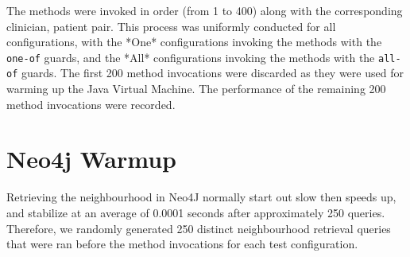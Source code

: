 \documentclass{acm_proc_article-sp}
\newcommand{\textcode}[1]{\texttt{#1}}
\begin{document}
The methods were invoked in order (from 1 to 400) along with the
corresponding clinician, patient pair. This process was uniformly
conducted for all configurations, with the *\textsf{One}*
configurations invoking the methods with the \textcode{one-of} guards,
and the *\textsf{All}* configurations invoking the methods with the
\textcode{all-of} guards. The first 200 method invocations were
discarded as they were used for warming up the Java Virtual Machine.
The performance of the remaining 200 method invocations were recorded.

\section{N\MakeLowercase{eo}4\MakeLowercase{j} Warmup}
Retrieving the neighbourhood in Neo4J normally start out slow then 
speeds up, and stabilize at an average of 0.0001 seconds after
approximately 250 queries. Therefore, we randomly generated 250 distinct
neighbourhood retrieval queries that were ran before the method 
invocations for each test configuration.


\begin{comment}
We randomly generate 50 method invocations to be shared by the
*\textsf{One}* configurations, and another 50 method invocations to be
shared by the *\textsf{All}* configurations.  Every time a
configuration is tested, 50 fresh user-patient pairs will be generated
for the 50 method calls of that configuration.
\end{comment}
\end{document}
